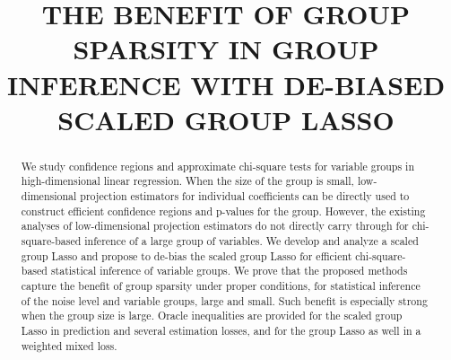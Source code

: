 \documentclass[11pt,preprint]{imsart}
\numberwithin{equation}{section}
\theoremstyle{plain}
\theoremstyle{remark}
\theoremstyle{mystyle}
\begin{document}
\begin{frontmatter}
\title{\normalsize{THE BENEFIT OF GROUP SPARSITY IN GROUP\\ INFERENCE 
WITH DE-BIASED SCALED GROUP LASSO}}

\begin{abstract}
We study confidence regions and approximate chi-square tests for variable groups 
in high-dimensional linear regression. 
When the size of the group is small, low-dimensional projection estimators for individual 
coefficients can be directly used to construct efficient confidence regions and p-values 
for the group. 
However, the existing analyses of low-dimensional projection estimators do not directly carry 
through for chi-square-based inference of a large group of variables. 
We develop and analyze a scaled group Lasso and propose to de-bias the scaled group Lasso 
for efficient chi-square-based statistical inference of variable groups. 
We prove that the proposed methods capture the benefit of group sparsity under proper 
conditions, for statistical inference of the noise level and variable groups, large and small. 
Such benefit is especially strong when the group size is large. 
Oracle inequalities are provided for the scaled group Lasso in prediction and several estimation losses, 
and for the group Lasso as well in a weighted mixed loss. 

\end{abstract}

\begin{keyword}
\end{keyword}
\end{frontmatter}
\end{document}
